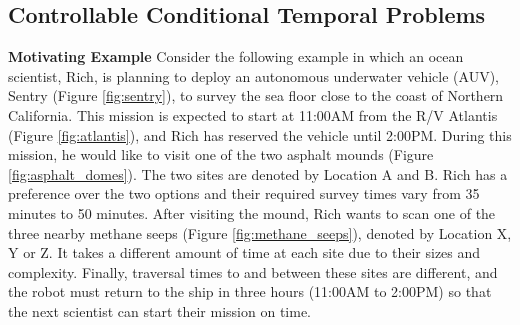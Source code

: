 \documentclass[jair,twoside,11pt,theapa]{article}
\begin{document}
\subsection{Controllable Conditional Temporal Problems}

%

%



\textbf{Motivating Example} \indent Consider the following example in which an
ocean scientist, Rich, is planning to deploy an autonomous underwater vehicle
(AUV), Sentry (Figure \ref{fig:sentry}), to survey the sea floor close to the
coast of Northern California. This mission is expected to start at 11:00AM from
the R/V Atlantis (Figure \ref{fig:atlantis}), and Rich has reserved the vehicle
until 2:00PM. During this mission, he would like to visit one of the two asphalt
mounds (Figure \ref{fig:asphalt_domes}). The two sites are denoted by Location A
and B. Rich has a preference over the two options and their required survey
times vary from 35 minutes to 50 minutes. After visiting the mound, Rich wants
to scan one of the three nearby methane seeps (Figure \ref{fig:methane_seeps}),
denoted by Location X, Y or Z. It takes a different amount of time at each site
due to their sizes and complexity. Finally, traversal times to and between these
sites are different, and the robot must return to the ship in three hours
(11:00AM to 2:00PM) so that the next scientist can start their mission on
time.
\end{document}
